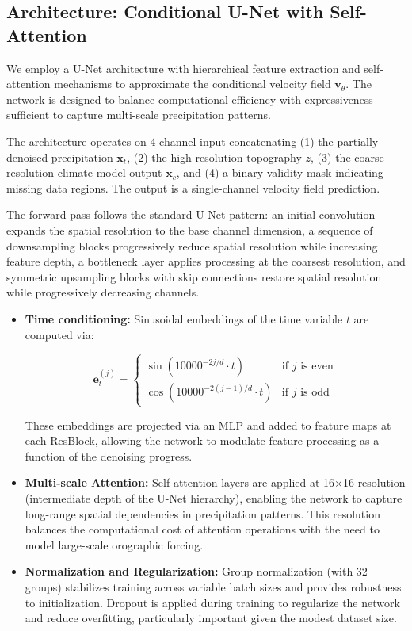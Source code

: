 \documentclass[12pt]{article}
\begin{document}
\subsection{Architecture: Conditional U-Net with Self-Attention}
    
We employ a U-Net architecture with hierarchical feature extraction and self-attention mechanisms to approximate the conditional velocity field $\mathbf{v}_\theta$. The network is designed to balance computational efficiency with expressiveness sufficient to capture multi-scale precipitation patterns.
    
The architecture operates on 4-channel input concatenating (1) the partially denoised precipitation $\mathbf{x}_t$, (2) the high-resolution topography $z$, (3) the coarse-resolution climate model output $\bar{\mathbf{x}}_c$, and (4) a binary validity mask indicating missing data regions. The output is a single-channel velocity field prediction.

The forward pass follows the standard U-Net pattern: an initial convolution expands the spatial resolution to the base channel dimension, a sequence of downsampling blocks progressively reduce spatial resolution while increasing feature depth, a bottleneck layer applies processing at the coarsest resolution, and symmetric upsampling blocks with skip connections restore spatial resolution while progressively decreasing channels.

\begin{itemize}

\item \textbf{Time conditioning:} Sinusoidal embeddings of the time variable $t$ are computed via:

\begin{equation}
\mathbf{e}_t^{(j)} =
  \begin{cases}
    \sin(10000^{-2j/d} \cdot t)    & \mbox{if } j \mbox{ is even} \\
    \cos(10000^{-2(j-1)/d} \cdot t) & \mbox{if } j \mbox{ is odd}
  \end{cases}
\end{equation}

These embeddings are projected via an MLP and added to feature maps at each ResBlock, allowing the network to modulate feature processing as a function of the denoising progress.


\item \textbf{Multi-scale Attention:} Self-attention layers are applied at 16×16 resolution (intermediate depth of the U-Net hierarchy), enabling the network to capture long-range spatial dependencies in precipitation patterns. This resolution balances the computational cost of attention operations with the need to model large-scale orographic forcing.

\item \textbf{Normalization and Regularization:} Group normalization (with 32 groups) stabilizes training across variable batch sizes and provides robustness to initialization. Dropout is applied during training to regularize the network and reduce overfitting, particularly important given the modest dataset size.

\end{itemize}
\end{document}
